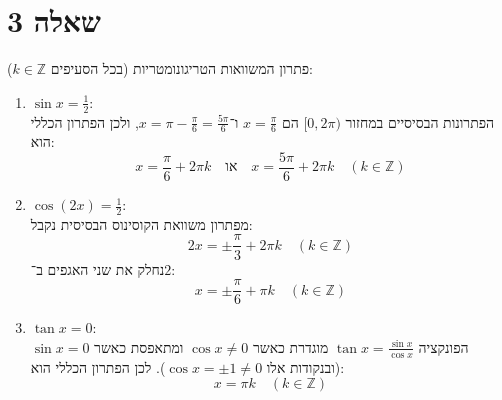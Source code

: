 \section{שאלה 3}
פתרון המשוואות הטריגונומטריות (בכל הסעיפים $k \in \mathbb{Z}$):
\begin{enumerate}
	\item $\sin x = \frac{1}{2}$: \\
		הפתרונות הבסיסיים במחזור $[0, 2\pi)$ הם $x = \frac{\pi}{6}$ ו־$x = \pi - \frac{\pi}{6} = \frac{5\pi}{6}$, ולכן הפתרון הכללי הוא:
		\[
			x = \frac{\pi}{6} + 2\pi k \quad \text{או} \quad x = \frac{5\pi}{6} + 2\pi k \quad (k \in \mathbb{Z})
		\]

	\item $\cos(2x) = \frac{1}{2}$: \\
		מפתרון משוואת הקוסינוס הבסיסית נקבל:
		\[
			2x = \pm \frac{\pi}{3} + 2\pi k \quad (k \in \mathbb{Z})
		\]
		נחלק את שני האגפים ב־$2$:
		\[
			x = \pm \frac{\pi}{6} + \pi k \quad (k \in \mathbb{Z})
		\]

	\item $\tan x = 0$: \\
		הפונקציה $\tan x = \frac{\sin x}{\cos x}$ מוגדרת כאשר $\cos x \ne 0$ ומתאפסת כאשר $\sin x = 0$ (ובנקודות אלו $\cos x = \pm 1 \ne 0$). לכן הפתרון הכללי הוא:
		\[
			x = \pi k \quad (k \in \mathbb{Z})
		\]
\end{enumerate}

